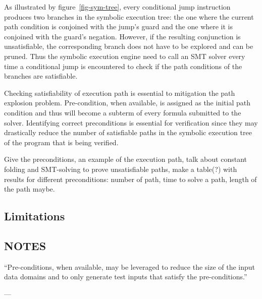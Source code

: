 As illustrated by figure~\ref{fig-sym-tree}, every conditional jump instruction produces
two branches in the symbolic execution tree: the one
where the current path condition is conjoined with the jump's guard and the one where it is
conjoined with the guard's negation. However, if the resulting
conjunction is unsatisfiable, the corresponding branch does not have to be explored
and can be pruned. Thus the symbolic execution engine need to call an SMT solver every
time a conditional jump is encountered to check if the path conditions of the branches
are satisfiable.

Checking satisfiability of execution path is essential to mitigation the path explosion
problem. Pre-condition, when available, is assigned as the initial path condition and thus
will become a subterm of every formula submitted to the solver. Identifying correct preconditions
is essential for verification since they may drastically reduce the number of satisfiable paths
in the symbolic execution tree of the program that is being verified.


Give the preconditions, an example of the execution path, talk about constant folding
and SMT-solving to prove unsatisfiable paths, make a table(?) with results for different
preconditions: number of path, time to solve a path, length of the path maybe.

\subsection{Limitations}



\subsection{NOTES}

``Pre-conditions, when
available, may be leveraged to reduce the size of the input
data domains and to only generate test inputs that satisfy
the pre-conditions.''


---
